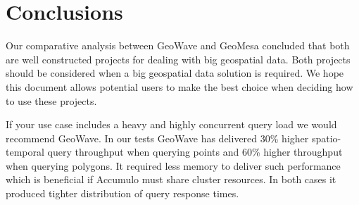 \section{Conclusions}
\label{sec:conclusions}

Our comparative analysis between GeoWave and GeoMesa concluded that both are well constructed projects for dealing with big geospatial data.
Both projects should be considered when a big geospatial data solution is required.
We hope this document allows potential users to make the best choice when deciding how to use these projects.

If your use case includes a heavy and highly concurrent query load we would recommend GeoWave.
In our tests GeoWave has delivered $30$\% higher spatio-temporal query throughput when querying points and $60$\% higher throughput when querying polygons.
It required less memory to deliver such performance which is beneficial if Accumulo must share cluster resources.
In both cases it produced tighter distribution of query response times.

